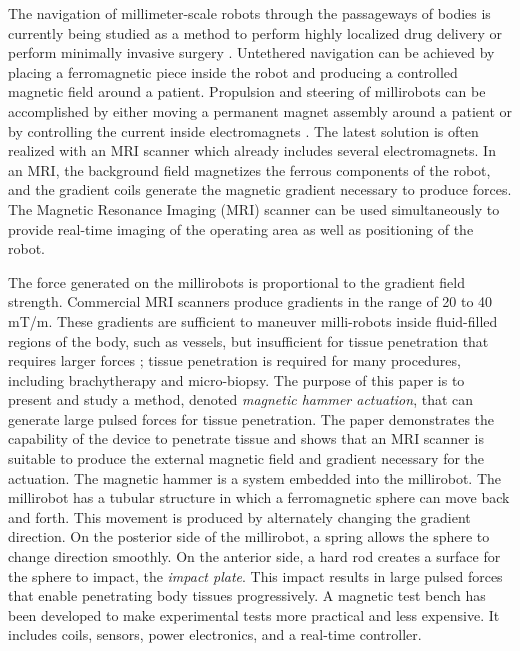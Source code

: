 \documentclass[letterpaper, 10 pt, conference]{ieeeconf}  %
\begin{document}
The navigation of millimeter-scale robots through the passageways of bodies is currently being studied as a method to perform highly localized drug delivery or perform minimally invasive surgery \cite{7067029,702,mi2020295}. Untethered navigation can be achieved by placing a ferromagnetic piece inside the robot and producing a controlled magnetic field around a patient. Propulsion and steering of millirobots can be accomplished by either moving a permanent magnet assembly around a patient \cite{taylor} or by controlling the current inside electromagnets \cite{MRM21638}. The latest solution is often realized with an MRI scanner which already includes several electromagnets. In an MRI, the background field magnetizes the ferrous components of the robot, and the gradient coils generate the magnetic gradient necessary to produce forces. 
The Magnetic Resonance Imaging (MRI) scanner can be used simultaneously to provide real-time imaging of the operating area as well as positioning of the robot.\par
The force generated on the millirobots is proportional to the gradient field  strength. 
Commercial MRI scanners produce gradients in the range of 20 to 40 mT/m. 
These gradients are sufficient to maneuver milli-robots inside fluid-filled regions of the body, such as vessels, \cite{martel2007automatic} but insufficient for tissue penetration that requires larger forces \cite{7139341}; tissue penetration is required for many procedures, including brachytherapy and micro-biopsy.
The purpose of this paper is to present and study a method, denoted  \emph{magnetic hammer actuation}, that can generate large pulsed forces for tissue penetration. The paper demonstrates the capability of the device to penetrate tissue and shows that an MRI scanner is suitable to produce the external magnetic field and gradient necessary for the actuation.
The magnetic hammer is a system embedded into the millirobot. 
The millirobot has a tubular structure in which a ferromagnetic sphere can move back and forth.
 This movement is produced by alternately changing the gradient direction. 
 On the posterior side of the millirobot, a spring allows the sphere to change direction smoothly. 
 On the anterior side, a hard rod creates a surface for the sphere to impact, the \emph{impact plate}.
  This impact results in large pulsed forces that enable penetrating body tissues progressively.
A magnetic test bench has been developed to make experimental tests more practical and less expensive.
 It includes coils, sensors, power electronics, and a real-time controller.\par
\end{document}
